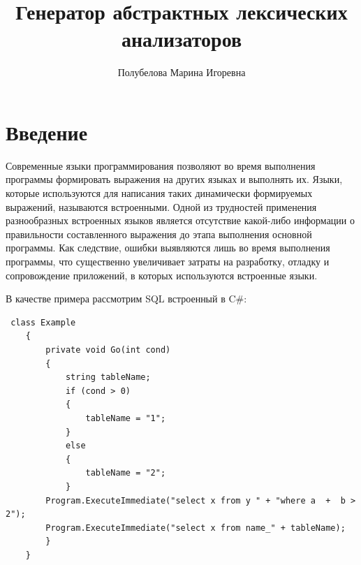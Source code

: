%

\title{Генератор абстрактных лексических анализаторов}
%

\author{Полубелова Марина Игоревна}
%
%
%

\maketitle              %

\section*{Введение}
Современные языки программирования позволяют во время выполнения программы формировать выражения на других языках и выполнять их. 
Языки, которые используются для написания таких динамически формируемых выражений, называются встроенными. 
Одной из трудностей  применения разнообразных встроенных языков является отсутствие  какой-либо информации о правильности 
составленного выражения до этапа выполнения основной программы. Как следствие, ошибки выявляются лишь во время выполнения программы, 
что существенно увеличивает затраты на разработку, отладку и сопровождение приложений, в которых используются встроенные языки. 

В качестве примера рассмотрим SQL встроенный в C\#:

\begin{verbatim}
 class Example
    {
        private void Go(int cond)
        {
            string tableName;
            if (cond > 0)
            {
                tableName = "1";
            }
            else
            {
                tableName = "2";
            }
        Program.ExecuteImmediate("select x from y " + "where a  +  b > 2");
        Program.ExecuteImmediate("select x from name_" + tableName);
        }
    }
\end{verbatim}


